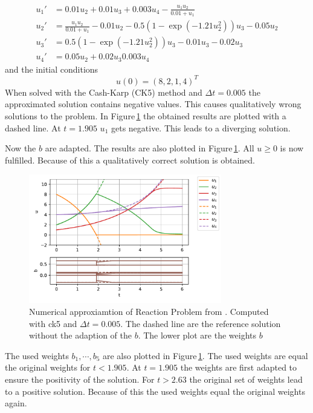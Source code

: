 \documentclass{article}
\begin{document}
\begin{subequations}
\label{eq:Reaction}
\begin{align}
u_1' &= 0.01u_2 + 0.01 u_3 +0.003u_4 - \frac{u_1 u_2}{0.01+u_1} \\
u_2' &= \frac{u_1u_2}{0.01+u_1}-0.01 u_2-0.5(1-\exp(-1.21 u_2^2)) u_3 -0.05 u_2 \\
u_3' &= 0.5(1-\exp(-1.21u_2^2)) u_3 - 0.01 u_3 -0.02 u_3 \\
u_4' &=0.05 u_2 + 0.02 u_3 0.003u_4
\end{align}
\end{subequations}
and the initial conditions
\begin{equation}
u(0) = (8,2,1,4)^T
\end{equation}
When solved with the Cash-Karp (CK5) method and $\Delta t = 0.005$ the approximated solution contains negative values. This causes qualitatively wrong solutions to the problem. 
In Figure\,\ref{fig:exampleI} the obtained results are plotted with a dashed line. 
At $t=1.905$ $u_1$ gets negative. This leads to a diverging solution.

Now the $b$ are adapted. The results are also plotted in Figure\,\ref{fig:exampleI}. 
All $u\geq0$ is now fulfilled. Because of this a qualitatively correct solution is obtained.

\begin{figure}[h]
    \centering
    \includegraphics[width=0.75\textwidth]{plots/exampleI.pdf}
    \caption{Numerical approxiamtion of Reaction Problem from \cite{kopecz_comparison_2019}. Computed with ck5 and $\Delta t = 0.005$. The dashed line are the reference solution without the adaption of the $b$. The lower plot are the weights $b$ }
    \label{fig:exampleI}
\end{figure}

The used weights $b_1,\cdots,b_5$ are also plotted in Figure\,\ref{fig:exampleI}. 
The used weights are equal the original weights for $t<1.905$. At $t=1.905$ the weights are first adapted to ensure the positivity of the solution. For $t>2.63$ the original set of weights lead to a positive solution. Because of this the used weights equal the original weights again.
\end{document}
